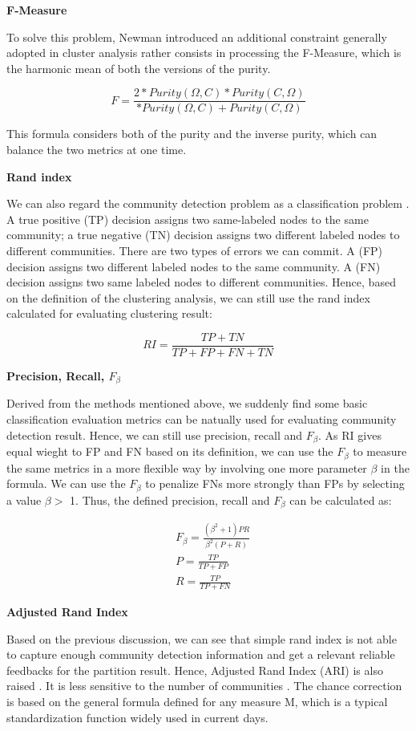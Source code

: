 \textbf{F-Measure}

To solve this problem, Newman \cite{newman2004finding} introduced an additional constraint generally adopted in cluster
analysis rather consists in processing the F-Measure, which is the harmonic mean of
both the versions of the purity.

$$
F = \frac{2*Purity(\Omega,C)*Purity(C,\Omega)}{*Purity(\Omega,C)+Purity(C,\Omega)}
$$

This formula considers both of the purity and the inverse purity, which can balance the two metrics at one time.

\textbf{Rand index}

We can also regard the community detection problem as a classification problem \cite{hubert1985comparing}.
A true positive (TP) decision assigns two same-labeled nodes to the same community;
a true negative (TN) decision assigns two different labeled nodes to different communities. There are two types of errors we can commit. A (FP) decision assigns two different labeled nodes to the same community. A (FN) decision assigns two same labeled nodes to different communities. Hence, based on the definition of the clustering analysis, we can still use the rand index calculated for evaluating clustering result:

$$
RI = \frac{TP+TN}{TP+FP+FN+TN}
$$

\textbf{Precision, Recall, $F_{\beta}$}

Derived from the methods mentioned above, we suddenly find some basic classification evaluation metrics can be natually used for evaluating community detection result. Hence, we can still use precision, recall and $F_{\beta}$. As RI gives equal wieght to FP and FN based on its definition, we can use the $F_{\beta}$ to measure the same metrics in a more flexible way by involving one more parameter $\beta$ in the formula. We can use the $F_{\beta}$  to penalize FNs more
strongly than FPs by selecting a value $\beta >$  1. Thus, the defined precision, recall and $F_{\beta}$ can be calculated as:

$$
\begin{aligned}
& F_{\beta} = \frac{(\beta^{2}+1)PR}{\beta^{2}(P+R)} \\
& P = \frac{TP}{TP+FP}\\
&R = \frac{TP}{TP+FN}
\end{aligned}
$$ 

\textbf{Adjusted  Rand Index}

Based on the previous discussion, we can see that simple rand index is not able to capture enough community detection information and get a relevant reliable feedbacks for the partition result. Hence, Adjusted Rand Index (ARI) is also raised \cite{hubert1985comparing}. It is less sensitive to the number of communities \cite{nguyen2009information}. The chance correction is based on the general formula defined for any measure M, which is a typical standardization function widely used in current days. 

